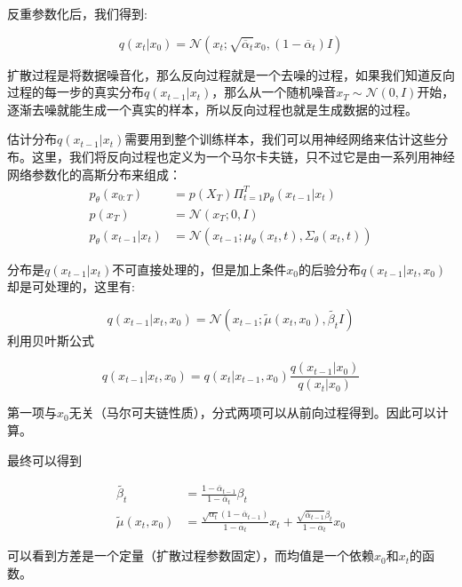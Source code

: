 反重参数化后，我们得到:

\begin{equation}\label{eqn-14}
      q(x_t|x_{0})=\mathcal{N}(x_t;\sqrt{\overline{\alpha}_t}x_{0},(1-\overline{\alpha}_t)I)
\end{equation}

扩散过程是将数据噪音化，那么反向过程就是一个去噪的过程，如果我们知道反向过程的每一步的真实分布$q(x_{t-1}|x_t)$，那么从一个随机噪音$x_T \sim \mathcal{N}(0,I)$开始，逐渐去噪就能生成一个真实的样本，所以反向过程也就是生成数据的过程。

估计分布$q(x_{t-1}|x_t)$需要用到整个训练样本，我们可以用神经网络来估计这些分布。这里，我们将反向过程也定义为一个马尔卡夫链，只不过它是由一系列用神经网络参数化的高斯分布来组成：
$$\begin{aligned}
      p_{\theta}(x_{0:T}) &= p(X_T)\Pi^T_{t=1}{p_{\theta}(x_{t-1}|x_t)} \\
      p(x_T) &= \mathcal{N}(x_T;0,I)\\
      p_{\theta}(x_{t-1}|x_t) &= \mathcal{N}(x_{t-1};\mu_{\theta}(x_t,t),\Sigma_{\theta}(x_t,t))
\end{aligned}$$

分布是$q(x_{t-1}|x_t)$不可直接处理的，但是加上条件$x_0$的后验分布$q(x_{t-1}|x_t,x_0)$却是可处理的，这里有:

\begin{equation}\label{eqn-15}
      q(x_{t-1}|x_t,x_0) = \mathcal{N}(x_{t-1};\widetilde{\mu}(x_t,x_0),\widetilde{\beta_t}I)
\end{equation}
利用贝叶斯公式

\begin{equation}\label{eqn-16}
      q(x_{t-1}|x_t,x_0) = q(x_{t}|x_{t-1},x_0)\frac{q(x_{t-1}|x_0)}{q(x_{t}|x_0)}
\end{equation}

第一项与$x_0$无关（马尔可夫链性质），分式两项可以从前向过程得到。因此可以计算。

最终可以得到

$$\begin{aligned}
\widetilde{\beta_t} &= \frac{1 - \overline{\alpha}_{t-1}}{1 - \overline{\alpha}_{t}}\beta_t \\
\widetilde{\mu}(x_t,x_0) &= \frac{\sqrt{\alpha_t}(1- \overline{\alpha}_{t-1})}{1- \overline{\alpha}_{t}}x_t + \frac{\sqrt{\overline{\alpha}_{t-1}}\beta_t}{1- \overline{\alpha}_{t}}x_0
\end{aligned}$$

可以看到方差是一个定量（扩散过程参数固定），而均值是一个依赖$x_0$和$x_t$的函数。

